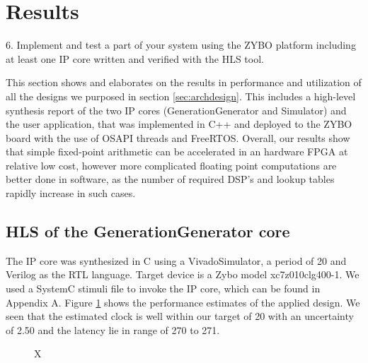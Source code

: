 \section{Results}\label{sec:results}
\begin{framed}
6. Implement and test a part of your system using the ZYBO platform including at least one IP core written and verified with the HLS tool.
\end{framed}

This section shows and elaborates on the results in performance and utilization of all the designs we purposed in section \ref{sec:archdesign}. This includes a high-level synthesis report of the two IP cores (GenerationGenerator and Simulator) and the user application, that was implemented in C++ and deployed to the ZYBO board with the use of OSAPI threads and FreeRTOS. Overall, our results show that simple fixed-point arithmetic can be accelerated in an hardware FPGA at relative low cost, however more complicated floating point computations are better done in software, as the number of required DSP's and lookup tables rapidly increase in such cases.

\subsection{HLS of the GenerationGenerator core}

The IP core was synthesized in C using a VivadoSimulator, a period of 20 and Verilog as the RTL language. Target device is a Zybo model xc7z010clg400-1. We used a SystemC stimuli file to invoke the IP core, which can be found in Appendix A. Figure \ref{fig:ggperformanceestimates} shows the performance estimates of the applied design. We seen that the estimated clock is well within our target of 20 with an uncertainty of 2.50 and the latency lie in range of 270 to 271.

\begin{figure}[htbp]
	\centering
	\caption{X}
	\label{fig:ggperformanceestimates}
\end{figure}

